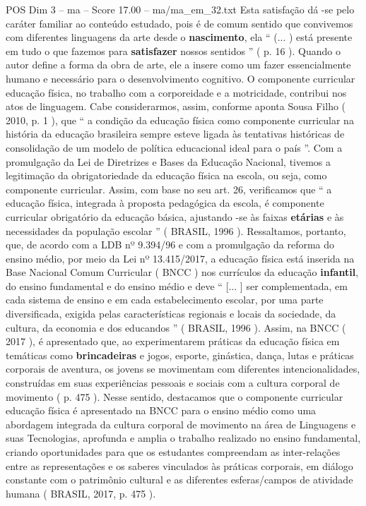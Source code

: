 \begin{textsample}{POS Dim 3 – ma – Score 17.00 – ma/ma\_em\_32.txt}
Esta satisfação dá -se pelo caráter familiar ao conteúdo estudado, pois é de comum sentido que convivemos com diferentes linguagens da arte desde o \textbf{nascimento}, ela “ (... ) está presente em tudo o que fazemos para \textbf{satisfazer} nossos sentidos ” ( p. 16 ).
Quando o autor define a forma da obra de arte, ele a insere como um fazer essencialmente humano e necessário para o desenvolvimento cognitivo.
O componente curricular educação física, no trabalho com a corporeidade e a motricidade, contribui nos atos de linguagem.
Cabe considerarmos, assim, conforme aponta Sousa Filho ( 2010, p. 1 ), que “ a condição da educação física como componente curricular na história da educação brasileira sempre esteve ligada às tentativas históricas de consolidação de um modelo de política educacional ideal para o país ”.
Com a promulgação da Lei de Diretrizes e Bases da Educação Nacional, tivemos a legitimação da obrigatoriedade da educação física na escola, ou seja, como componente curricular.
Assim, com base no seu art. 26, verificamos que “ a educação física, integrada à proposta pedagógica da escola, é componente curricular obrigatório da educação básica, ajustando -se às faixas \textbf{etárias} e às necessidades da população escolar ” ( BRASIL, 1996 ).
Ressaltamos, portanto, que, de acordo com a LDB nº 9.394/96 e com a promulgação da reforma do ensino médio, por meio da Lei nº 13.415/2017, a educação física está inserida na Base Nacional Comum Curricular ( BNCC ) nos currículos da educação \textbf{infantil}, do ensino fundamental e do ensino médio e deve “ [... ] ser complementada, em cada sistema de ensino e em cada estabelecimento escolar, por uma parte diversificada, exigida pelas características regionais e locais da sociedade, da cultura, da economia e dos educandos ” ( BRASIL, 1996 ).
Assim, na BNCC ( 2017 ), é apresentado que, ao experimentarem práticas da educação física em temáticas como \textbf{brincadeiras} e jogos, esporte, ginástica, dança, lutas e práticas corporais de aventura, os jovens se movimentam com diferentes intencionalidades, construídas em suas experiências pessoais e sociais com a cultura corporal de movimento ( p. 475 ).
Nesse sentido, destacamos que o componente curricular educação física é apresentado na BNCC para o ensino médio como uma abordagem integrada da cultura corporal de movimento na área de Linguagens e suas Tecnologias, aprofunda e amplia o trabalho realizado no ensino fundamental, criando oportunidades para que os estudantes compreendam as inter-relações entre as representações e os saberes vinculados às práticas corporais, em diálogo constante com o patrimônio cultural e as diferentes esferas/campos de atividade humana ( BRASIL, 2017, p. 475 ).

\end{textsample}
